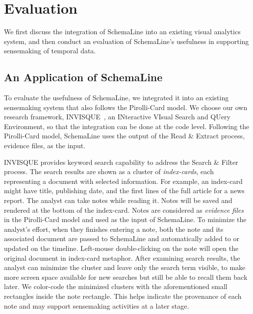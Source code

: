 \section{Evaluation}
\label{sec:evaluation}

We first discuss the integration of SchemaLine into an existing visual analytics system, and then conduct an evaluation of SchemaLine's usefulness in supporting sensemaking of temporal data.

\subsection{An Application of SchemaLine}
To evaluate the usefulness of SchemaLine, we integrated it into an existing sensemaking system that also follows the Pirolli-Card model. We choose our own research framework, INVISQUE~\cite{Wong2011}, an INteractive VIsual Search and QUery Environment, so that the integration can be done at the code level. Following the Pirolli-Card model, SchemaLine uses the output of the Read \& Extract process, evidence files, as the input.

 INVISQUE provides keyword search capability to address the Search \& Filter process. The search results are shown as a cluster of \textit{index-cards}, each representing a document with selected information. For example, an index-card might have title, publishing date, and the first lines of the full article for a news report. The analyst can take notes while reading it. Notes will be saved and rendered at the bottom of the index-card. Notes are considered as \textit{evidence files} in the Pirolli-Card model and used as the input of SchemaLine. To minimize the analyst's effort, when they finishes entering a note, both the note and its associated document are passed to SchemaLine and automatically added to or updated on the timeline. Left-mouse double-clicking on the note will open the original document in index-card metaphor. After examining search results, the analyst can minimize the cluster and leave only the search term visible, to make more screen space available for new searches but still be able to recall them back later. We color-code the minimized clusters with the aforementioned small rectangles inside the note rectangle. This helps indicate the provenance of each note and may support sensemaking activities at a later stage.

